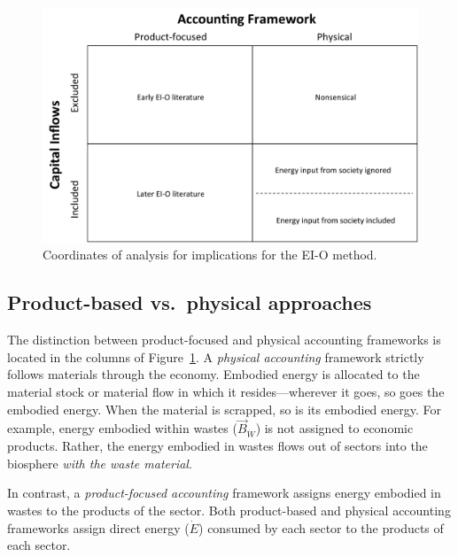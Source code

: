 \begin{figure}[!ht]
\centering{}
\includegraphics[width=0.8\linewidth]{Part_3/Chapter_Implications/Images/Grid.pdf}
\caption[Coordinates of analysis for implications for the I-O method]{Coordinates of analysis for implications for the EI-O method.}
\label{fig:coords_of_analysis}
\end{figure}


\subsection{Product-based vs.\ physical approaches}
\label{sec:prod_vs_physical}

The distinction between product-focused and physical
accounting frameworks is located in the columns
of Figure~\ref{fig:coords_of_analysis}.
A \emph{physical accounting} framework strictly follows materials 
through the economy. 
Embodied energy is allocated to the material stock or material flow
in which it resides---wherever it goes, so goes the embodied energy. 
When the material is scrapped, so is its embodied energy.
For example, energy embodied within wastes ($\vec{B}_{\dot{W}}$) 
is not assigned to economic products. 
Rather, the energy embodied in wastes flows out of sectors 
into the biosphere \emph{with the waste material}.

In contrast, a \emph{product-focused accounting} framework assigns 
energy embodied in wastes to the products of the sector.
Both product-based and physical accounting frameworks
assign direct energy ($\dot{E}$) consumed by each sector
to the products of each sector.

